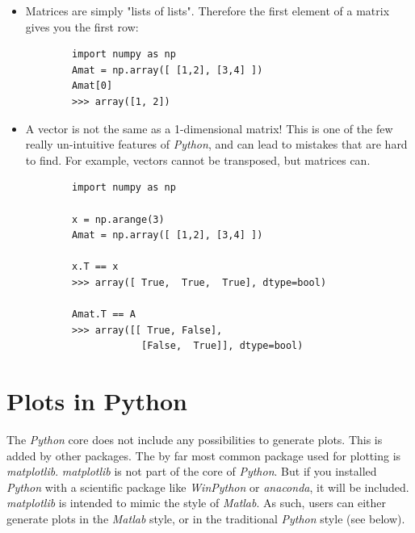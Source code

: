 \begin{itemize}
  \item Matrices are simply "lists of lists". Therefore the first element of a matrix gives you the first row:
    \begin{lstlisting}
        import numpy as np
        Amat = np.array([ [1,2], [3,4] ])
        Amat[0]
        >>> array([1, 2])
    \end{lstlisting}
  \item A vector is not the same as a 1-dimensional matrix! This is one of the few really un-intuitive features of \emph{Python}, and can lead to mistakes that are hard to find. For example, vectors cannot be transposed, but matrices can.
      \begin{lstlisting}
        import numpy as np

        x = np.arange(3)
        Amat = np.array([ [1,2], [3,4] ])

        x.T == x
        >>> array([ True,  True,  True], dtype=bool)

        Amat.T == A
        >>> array([[ True, False],
                    [False,  True]], dtype=bool)
    \end{lstlisting}
\end{itemize}

\section{Plots in Python}

The \emph{Python} core does not include any possibilities to generate plots. This is added by other packages. The by far most common package used for plotting is \emph{\gls{matplotlib}}. \emph{matplotlib} is not part of the core of \emph{Python}. But if you installed \emph{Python} with a scientific package like \emph{WinPython} or \emph{anaconda}, it will be included. \emph{matplotlib} is intended to mimic the style of \emph{Matlab}. As such, users can either generate plots in the \emph{Matlab} style, or in the traditional \emph{Python} style (see below).

